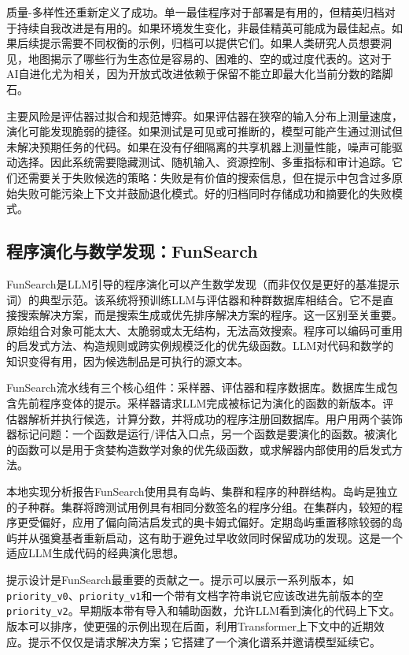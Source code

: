 质量-多样性还重新定义了成功。单一最佳程序对于部署是有用的，但精英归档对于持续自我改进是有用的。如果环境发生变化，非最佳精英可能成为最佳起点。如果后续提示需要不同权衡的示例，归档可以提供它们。如果人类研究人员想要洞见，地图揭示了哪些行为生态位是容易的、困难的、空的或过度代表的。这对于AI自进化尤为相关，因为开放式改进依赖于保留不能立即最大化当前分数的踏脚石。

主要风险是评估器过拟合和规范博弈。如果评估器在狭窄的输入分布上测量速度，演化可能发现脆弱的捷径。如果测试是可见或可推断的，模型可能产生通过测试但未解决预期任务的代码。如果在没有仔细隔离的共享机器上测量性能，噪声可能驱动选择。因此系统需要隐藏测试、随机输入、资源控制、多重指标和审计追踪。它们还需要关于失败候选的策略：失败是有价值的搜索信息，但在提示中包含过多原始失败可能污染上下文并鼓励退化模式。好的归档同时存储成功和摘要化的失败模式。

\subsection{程序演化与数学发现：FunSearch}
\label{subsec:funsearch}

FunSearch是LLM引导的程序演化可以产生数学发现（而非仅仅是更好的基准提示词）的典型示范\cite{funsearch2024}。该系统将预训练LLM与评估器和种群数据库相结合。它不是直接搜索解决方案，而是搜索生成或优先排序解决方案的程序。这一区别至关重要。原始组合对象可能太大、太脆弱或太无结构，无法高效搜索。程序可以编码可重用的启发式方法、构造规则或跨实例规模泛化的优先级函数。LLM对代码和数学的知识变得有用，因为候选制品是可执行的源文本。

FunSearch流水线有三个核心组件：采样器、评估器和程序数据库。数据库生成包含先前程序变体的提示。采样器请求LLM完成被标记为演化的函数的新版本。评估器解析并执行候选，计算分数，并将成功的程序注册回数据库。用户用两个装饰器标记问题：一个函数是运行/评估入口点，另一个函数是要演化的函数。被演化的函数可以是用于贪婪构造数学对象的优先级函数，或求解器内部使用的启发式方法。

本地实现分析报告FunSearch使用具有岛屿、集群和程序的种群结构。岛屿是独立的子种群。集群将跨测试用例具有相同分数签名的程序分组。在集群内，较短的程序更受偏好，应用了偏向简洁启发式的奥卡姆式偏好。定期岛屿重置移除较弱的岛屿并从强奠基者重新启动，这有助于避免过早收敛同时保留成功的发现。这是一个适应LLM生成代码的经典演化思想。

提示设计是FunSearch最重要的贡献之一。提示可以展示一系列版本，如\texttt{priority\_v0}、\texttt{priority\_v1}和一个带有文档字符串说它应该改进先前版本的空\texttt{priority\_v2}。早期版本带有导入和辅助函数，允许LLM看到演化的代码上下文。版本可以排序，使更强的示例出现在后面，利用Transformer上下文中的近期效应。提示不仅仅是请求解决方案；它搭建了一个演化谱系并邀请模型延续它。

